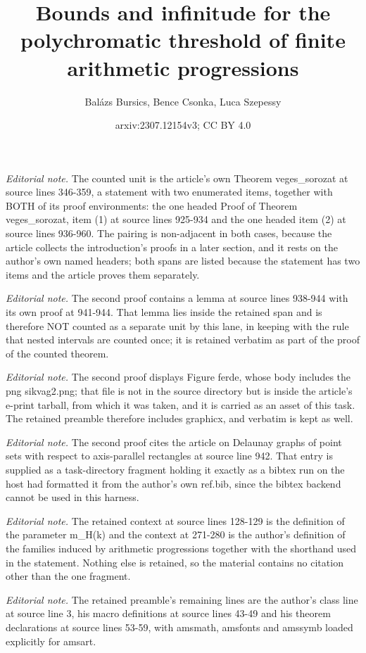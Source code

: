 \documentclass[11pt,oneside]{amsart}
\title{Bounds and infinitude for the polychromatic threshold of finite arithmetic progressions}
\author{Balázs Bursics, Bence Csonka, Luca Szepessy}
\date{arxiv:2307.12154v3; CC BY 4.0}
\begin{document}
\maketitle
\noindent\textit{Editorial note.} The counted unit is the article's own Theorem veges\_sorozat at source lines 346-359, a statement with two enumerated items, together with BOTH of its proof environments: the one headed Proof of Theorem veges\_sorozat, item (1) at source lines 925-934 and the one headed item (2) at source lines 936-960. The pairing is non-adjacent in both cases, because the article collects the introduction's proofs in a later section, and it rests on the author's own named headers; both spans are listed because the statement has two items and the article proves them separately.\par\medskip
\noindent\textit{Editorial note.} The second proof contains a lemma at source lines 938-944 with its own proof at 941-944. That lemma lies inside the retained span and is therefore NOT counted as a separate unit by this lane, in keeping with the rule that nested intervals are counted once; it is retained verbatim as part of the proof of the counted theorem.\par\medskip
\noindent\textit{Editorial note.} The second proof displays Figure ferde, whose body includes the png sikvag2.png; that file is not in the source directory but is inside the article's e-print tarball, from which it was taken, and it is carried as an asset of this task. The retained preamble therefore includes graphicx, and verbatim is kept as well.\par\medskip
\noindent\textit{Editorial note.} The second proof cites the article on Delaunay graphs of point sets with respect to axis-parallel rectangles at source line 942. That entry is supplied as a task-directory fragment holding it exactly as a bibtex run on the host had formatted it from the author's own ref.bib, since the bibtex backend cannot be used in this harness.\par\medskip
\noindent\textit{Editorial note.} The retained context at source lines 128-129 is the definition of the parameter m\_H(k) and the context at 271-280 is the author's definition of the families induced by arithmetic progressions together with the shorthand used in the statement. Nothing else is retained, so the material contains no citation other than the one fragment.\par\medskip
\noindent\textit{Editorial note.} The retained preamble's remaining lines are the author's class line at source line 3, his macro definitions at source lines 43-49 and his theorem declarations at source lines 53-59, with amsmath, amsfonts and amssymb loaded explicitly for amsart.\par\medskip
\end{document}
